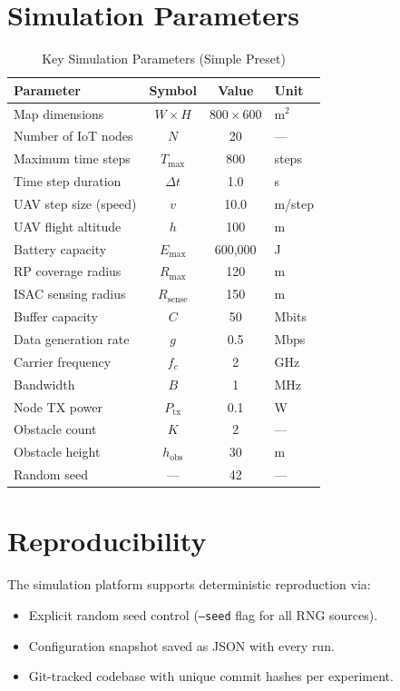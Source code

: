 \documentclass[12pt, a4paper, oneside]{report}
\begin{document}
\section{Simulation Parameters}

\begin{table}[htbp]
\centering
\caption{Key Simulation Parameters (Simple Preset)}
\label{tab:sim_params}
\small
\begin{tabular}{lccl}
\toprule
\textbf{Parameter} & \textbf{Symbol} & \textbf{Value} & \textbf{Unit} \\
\midrule
Map dimensions & $W \times H$ & $800 \times 600$ & m$^2$ \\
Number of IoT nodes & $N$ & 20 & --- \\
Maximum time steps & $T_{\max}$ & 800 & steps \\
Time step duration & $\Delta t$ & 1.0 & s \\
UAV step size (speed) & $v$ & 10.0 & m/step \\
UAV flight altitude & $h$ & 100 & m \\
Battery capacity & $E_{\max}$ & 600,000 & J \\
RP coverage radius & $R_{\max}$ & 120 & m \\
ISAC sensing radius & $R_{\text{sense}}$ & 150 & m \\
Buffer capacity & $C$ & 50 & Mbits \\
Data generation rate & $g$ & 0.5 & Mbps \\
Carrier frequency & $f_c$ & 2 & GHz \\
Bandwidth & $B$ & 1 & MHz \\
Node TX power & $P_{\text{tx}}$ & 0.1 & W \\
Obstacle count & $K$ & 2 & --- \\
Obstacle height & $h_{\text{obs}}$ & 30 & m \\
Random seed & --- & 42 & --- \\
\bottomrule
\end{tabular}
\end{table}

\section{Reproducibility}

The simulation platform supports deterministic reproduction via:
\begin{itemize}
    \item Explicit random seed control (\texttt{--seed} flag for all RNG sources).
    \item Configuration snapshot saved as JSON with every run.
    \item Git-tracked codebase with unique commit hashes per experiment.
\end{itemize}
\end{document}
